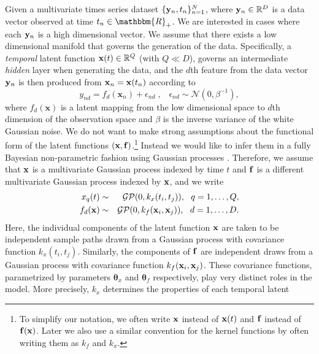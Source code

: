 \documentclass{article} %
\begin{document}
Given a multivariate times series dataset $\{\mathbf{y}_n,t_n\}_{n=1}^N$,
where $\mathbf{y}_n \in \mathbb{R}^D$ is a data vector observed at time $t_n
\in \mathbbm{R}_+$. We are interested in cases where each $\mathbf{y}_n$ is
a high dimensional vector. We assume that there exists a low
dimensional manifold that governs the generation of the data.
Specifically, a {\em temporal} latent function $\mathbf{x}(t) \in
\mathbb{R}^Q$ (with $Q \ll D$), governs an intermediate {\em hidden}
layer when generating the data, and the $d$th feature from the
data vector $\mathbf{y}_n$ is then produced from $\mathbf{x}_n = \mathbf{x}(t_n)$
according to
\begin{equation}
\label{generative}
\mathit{y_{nd}} = f_d(\mathbf{x}_n) + \epsilon_{nd} \;, \;\;\; \epsilon_{nd} \sim \mathcal{N}(0, \beta^{-1}),
\end{equation}
where %
$f_d(\mathbf{x})$ is a latent mapping from the low dimensional space
to $d$th dimension of the observation space and $\beta$ is the inverse
variance of the white Gaussian noise.  We do not want to make strong
assumptions about the functional form of the latent functions $(\mathbf{x},
\mathbf{f})$.\footnote{To simplify our notation, we often write $\mathbf{x}$
  instead of $\mathbf{x}(t)$ and $\mathbf{f}$ instead of $\mathbf{f}(\mathbf{x})$. Later we
  also use a similar convention for the kernel functions by often
  writing them as $\mathit{k}_f$ and $\mathit{k}_x$.} Instead we
would like to infer them in a fully Bayesian non-parametric fashion
using Gaussian processes \cite{rasmussen-williams}.  Therefore, we
assume that $\mathbf{x}$ is a multivariate Gaussian process indexed by time
$t$ and $\mathbf{f}$ is a different multivariate Gaussian process indexed by
$\mathbf{x}$, and we write
\begin{eqnarray}
x_q(t)  & \sim & \mathcal{GP}(0, k_x(t_i,t_j)), \ \ q=1,\ldots,Q, \\     
f_d(\bfx)  & \sim & \mathcal{GP}(0, k_f(\bfx_i,\bfx_j)), \ \ d=1,\ldots,D.
\label{eq:GPpriors}
\end{eqnarray}
Here, the individual components of the latent function $\mathbf{x}$ are
taken to be independent sample paths drawn from a Gaussian process
with covariance function $k_x(t_i,t_j)$. Similarly, the components of
$\mathbf{f}$ are independent draws from a Gaussian process with covariance
function $k_f(\mathbf{x}_i,\mathbf{x}_j)$.  These covariance functions,
parametrized by parameters $\boldsymbol \theta_x$ and $\boldsymbol
\theta_f$ respectively, play very distinct roles in the model. More
precisely, $k_x$ determines the properties of each temporal latent
\end{document}
